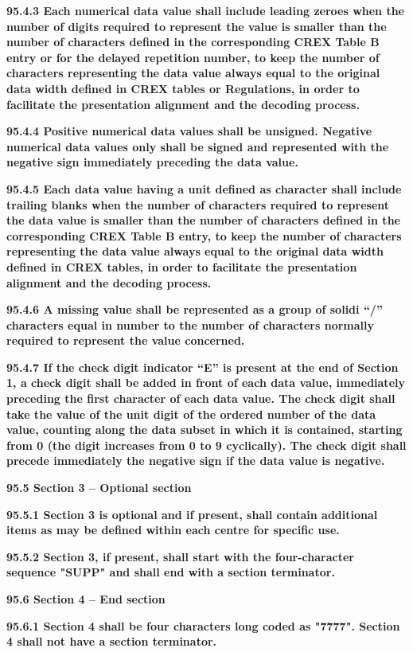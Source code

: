 \textbf{95.4.3 Each numerical data value shall include leading zeroes when the number of digits required to represent the value is smaller than the number of characters defined in the corresponding CREX Table B entry or for the delayed repetition number, to keep the number of characters representing the data value always equal to the original data width defined in CREX tables or Regulations, in order to facilitate the presentation alignment and the decoding process.}

\textbf{95.4.4 Positive numerical data values shall be unsigned. Negative numerical data values only shall be signed and represented with the negative sign immediately preceding the data value.}

\textbf{95.4.5 Each data value having a unit defined as character shall include trailing blanks when the number of characters required to represent the data value is smaller than the number of characters defined in the corresponding CREX Table B entry, to keep the number of characters representing the data value always equal to the original data width defined in CREX tables, in order to facilitate the presentation alignment and the decoding process.}

\textbf{95.4.6 A missing value shall be represented as a group of solidi ``/'' characters equal in number to the number of characters normally required to represent the value concerned.}

\textbf{95.4.7 If the check digit indicator ``E'' is present at the end of Section 1, a check digit shall be added in front of each data value, immediately preceding the first character of each data value. The check digit shall take the value of the unit digit of the ordered number of the data value, counting along the data subset in which it is contained, starting from 0 (the digit increases from 0 to 9 cyclically). The check digit shall precede immediately the negative sign if the data value is negative.}

\textbf{95.5 Section 3 -- Optional section}

\textbf{95.5.1 Section 3 is optional and if present, shall contain additional items as may be defined within each centre for specific use.}

\textbf{95.5.2 Section 3, if present, shall start with the four-character sequence "SUPP" and shall end with a section terminator.}

\textbf{95.6 Section 4 -- End section}

\textbf{95.6.1 Section 4 shall be four characters long coded as "7777". Section 4 shall not have a section terminator.}

